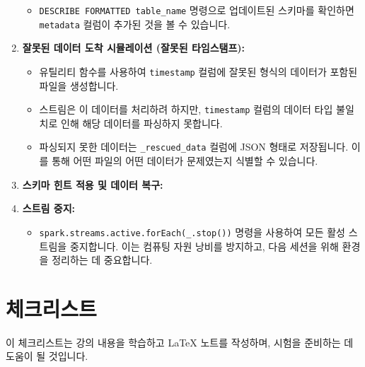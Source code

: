 \documentclass[11pt,a4paper]{article}
\theoremstyle{definition}
\begin{document}
\begin{examplebox}
\begin{enumerate}
\begin{itemize}
        \item \texttt{DESCRIBE FORMATTED table_name} 명령으로 업데이트된 스키마를 확인하면 \texttt{metadata} 컬럼이 추가된 것을 볼 수 있습니다.
    \end{itemize}
    \item \textbf{잘못된 데이터 도착 시뮬레이션 (잘못된 타임스탬프):}
    \begin{itemize}
        \item 유틸리티 함수를 사용하여 \texttt{timestamp} 컬럼에 잘못된 형식의 데이터가 포함된 파일을 생성합니다.
        \item 스트림은 이 데이터를 처리하려 하지만, \texttt{timestamp} 컬럼의 데이터 타입 불일치로 인해 해당 데이터를 파싱하지 못합니다.
        \item 파싱되지 못한 데이터는 \texttt{_rescued_data} 컬럼에 JSON 형태로 저장됩니다. 이를 통해 어떤 파일의 어떤 데이터가 문제였는지 식별할 수 있습니다.
    \end{itemize}
    \item \textbf{스키마 힌트 적용 및 데이터 복구:}
    \item \textbf{스트림 중지:}
    \begin{itemize}
        \item \texttt{spark.streams.active.forEach(_.stop())} 명령을 사용하여 모든 활성 스트림을 중지합니다. 이는 컴퓨팅 자원 낭비를 방지하고, 다음 세션을 위해 환경을 정리하는 데 중요합니다.
    \end{itemize}
\end{enumerate}
\end{examplebox}

\newpage
\section{체크리스트}
이 체크리스트는 강의 내용을 학습하고 LaTeX 노트를 작성하며, 시험을 준비하는 데 도움이 될 것입니다.
\end{document}
